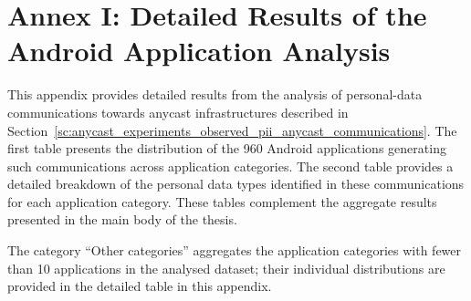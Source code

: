 \chapter{Annex I: Detailed Results of the Android Application Analysis}
\label{ch:appendix_android_analysis}

This appendix provides detailed results from the analysis of personal-data communications towards anycast infrastructures described in Section~\ref{sc:anycast_experiments_observed_pii_anycast_communications}. The first table presents the distribution of the 960 Android applications generating such communications across application categories. The second table provides a detailed breakdown of the personal data types identified in these communications for each application category. These tables complement the aggregate results presented in the main body of the thesis.

The category ``Other categories'' aggregates the application categories with fewer than 10 applications in the analysed dataset; their individual distributions are provided in the detailed table in this appendix.

